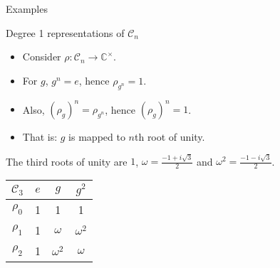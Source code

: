 \documentclass[10pt]{beamer}
\newcommand{\Cyc}{\mathcal{C}}
\newcommand{\CC}{\mathbb{C}}
\begin{document}
	\begin{frame}{Examples}
%				
%		
		\begin{block}{Degree 1 representations of $\Cyc_n$}
			\begin{itemize}
				\item Consider $\rho: \Cyc_n \rightarrow \CC^\times$.\pause
				
				\item For $g$, $g^n = e$, hence $\rho_{g^n} = 1$. 
				
				\item Also, $(\rho_g)^n = \rho_{g^n}$, hence $(\rho_g)^n = 1$.\pause
				
				\item That is: $g$ is mapped to $n$th root of unity.
			\end{itemize}
		\end{block}\pause
		
		\begin{example}[$\Cyc_3$]
			The third roots of unity are $1$, $\omega = \frac{-1+i\sqrt{3}}{2}$ and $\omega^2 = \frac{-1-i\sqrt{3}}{2}$.
			\begin{table}
				\centering
				\begin{tabular}{c | c c c}
					$\Cyc_3$ & $e$ & $g$        & $g^2$      \\ \hline
					$\rho_0$          & 1   & 1          & 1          \\
					$\rho_1$          & 1   & $\omega$   & $\omega^2$ \\
					$\rho_2$          & 1   & $\omega^2$ & $\omega$
				\end{tabular}
			\end{table}
		\end{example}
		
		

\end{frame}
\end{document}
